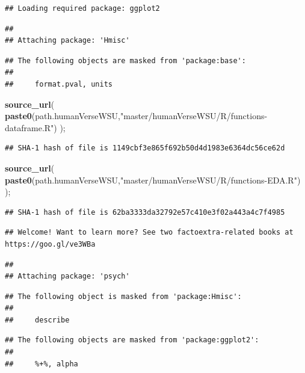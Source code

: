 \documentclass[]{article}
\newenvironment{Shaded}{\begin{snugshade}}{\end{snugshade}}
\newcommand{\KeywordTok}[1]{\textcolor[rgb]{0.13,0.29,0.53}{\textbf{#1}}}
\newcommand{\NormalTok}[1]{#1}
\newcommand{\StringTok}[1]{\textcolor[rgb]{0.31,0.60,0.02}{#1}}
\begin{document}
\begin{verbatim}
## Loading required package: ggplot2
\end{verbatim}

\begin{verbatim}
## 
## Attaching package: 'Hmisc'
\end{verbatim}

\begin{verbatim}
## The following objects are masked from 'package:base':
## 
##     format.pval, units
\end{verbatim}

\begin{Shaded}
\begin{Highlighting}[]
\KeywordTok{source\_url}\NormalTok{( }\KeywordTok{paste0}\NormalTok{(path.humanVerseWSU,}\StringTok{"master/humanVerseWSU/R/functions{-}dataframe.R"}\NormalTok{) );}
\end{Highlighting}
\end{Shaded}

\begin{verbatim}
## SHA-1 hash of file is 1149cbf3e865f692b50d4d1983e6364dc56ce62d
\end{verbatim}

\begin{Shaded}
\begin{Highlighting}[]
\KeywordTok{source\_url}\NormalTok{( }\KeywordTok{paste0}\NormalTok{(path.humanVerseWSU,}\StringTok{"master/humanVerseWSU/R/functions{-}EDA.R"}\NormalTok{) );}
\end{Highlighting}
\end{Shaded}

\begin{verbatim}
## SHA-1 hash of file is 62ba3333da32792e57c410e3f02a443a4c7f4985
\end{verbatim}

\begin{verbatim}
## Welcome! Want to learn more? See two factoextra-related books at https://goo.gl/ve3WBa
\end{verbatim}

\begin{verbatim}
## 
## Attaching package: 'psych'
\end{verbatim}

\begin{verbatim}
## The following object is masked from 'package:Hmisc':
## 
##     describe
\end{verbatim}

\begin{verbatim}
## The following objects are masked from 'package:ggplot2':
## 
##     %+%, alpha
\end{verbatim}
\end{document}
